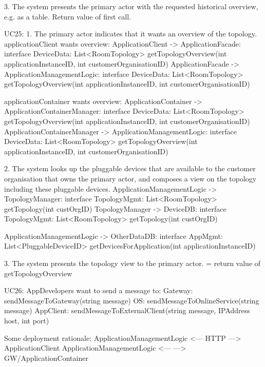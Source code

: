             3. The system presents the primary actor with the requested historical overview, e.g. as a table.
                Return value of first call.


        UC25:
            1. The primary actor indicates that it wants an overview of the topology.
                applicationClient wants overview:
                    ApplicationClient -> ApplicationFacade: interface DeviceData: List<RoomTopology> getTopologyOverview(int applicationInstanceID, int customerOrganisationID)
                    ApplicationFacade -> ApplicationManagementLogic: interface DeviceData: List<RoomTopology> getTopologyOverview(int applicationInstanceID, int customerOrganisationID)

                applicationContainer wants overview:
                    ApplicationContainer -> ApplicationContainerManager: interface DeviceData: List<RoomTopology> getTopologyOverview(int applicationInstanceID, int customerOrganisationID)
                    ApplicationContainerManager -> ApplicationManagementLogic: interface DeviceData: List<RoomTopology> getTopologyOverview(int applicationInstanceID, int customerOrganisationID)

            2. The system looks up the pluggable devices that are available to the customer organisation that owns the primary actor,
               and composes a view on the topology including these pluggable devices.
                    ApplicationManagementLogic -> TopologyManager: interface TopologyMgmt: List<RoomTopology> getTopology(int custOrgID)
                    TopologyManager -> DeviceDB: interface TopologyMgmt: List<RoomTopology> getTopology(int custOrgID)

                    ApplicationManagementLogic -> OtherDataDB: interface AppMgmt: List<PluggableDeviceID> getDevicesForApplication(int applicationInstanceID)

            3. The system presents the topology view to the primary actor.
                    = return value of getTopologyOverview

        UC26:
            AppDevelopers want to send a message to:
                Gateway:   sendMessageToGateway(string message)
                OS:        sendMessageToOnlineService(string message)
                AppClient: sendMessageToExternalClient(string message, IPAddress host, int port)

           Some deployment rationale: ApplicationManagementLogic <--- HTTP ---> ApplicationClient
                                      ApplicationManagementLogic <---      ---> GW/ApplicationContainer

